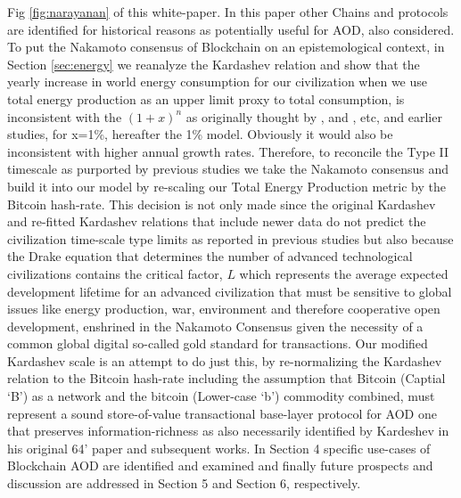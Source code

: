 \documentclass[final,5p,times,twocolumn,authoryear]{elsarticle}
\begin{document}
Fig \ref{fig:narayanan} of this white-paper. In this paper other Chains and protocols are identified for  historical reasons as potentially useful for AOD, also considered. To put the Nakamoto consensus of Blockchain on an epistemological context, in Section \ref{sec:energy} we reanalyze the Kardashev relation and show that the yearly increase in world energy consumption for our civilization when we use total energy production as an upper limit proxy to total consumption, is inconsistent with the $(1+x)^{n}$ as originally thought by \cite{kar64}, \cite{sagan73} and \cite{gray2020}, etc, and earlier studies, for x=1\%, hereafter the 1\% model. Obviously it would also be inconsistent with higher annual growth rates. Therefore, to reconcile the Type II timescale as purported by previous studies we take the Nakamoto consensus and build it into our model by re-scaling our Total Energy Production metric by the Bitcoin hash-rate. This decision is not only made since the original Kardashev and re-fitted Kardashev relations that include newer data do not predict the civilization time-scale type limits as reported in previous studies but also because the Drake equation that determines the number of advanced technological civilizations contains the critical factor, $L$ which represents the average expected development lifetime for an advanced civilization that must be sensitive to global issues like energy production, war, environment and therefore cooperative open development, enshrined in the Nakamoto Consensus given the necessity of a common global digital so-called gold standard for transactions. Our modified Kardashev scale is an attempt to do just this, by re-normalizing the Kardashev relation to the Bitcoin hash-rate including the assumption that Bitcoin (Captial `B') as a network and the bitcoin (Lower-case `b') commodity combined, must represent a sound store-of-value transactional base-layer protocol for AOD one that preserves information-richness as also necessarily identified by Kardeshev in his original 64' paper and subsequent works. In Section 4 specific use-cases of Blockchain AOD are identified and examined and finally future prospects and discussion are addressed in Section 5 and Section 6, respectively.
\end{document}
